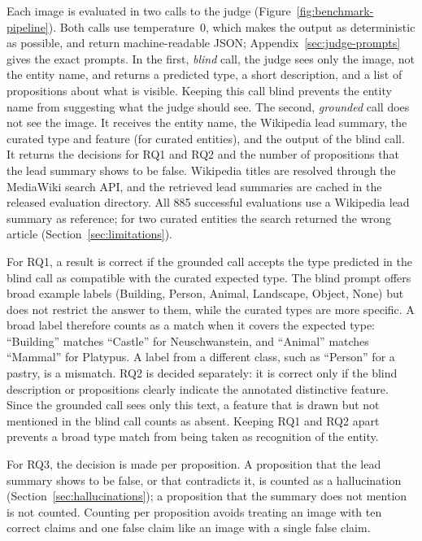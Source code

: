 Each image is evaluated in two calls to the judge
(Figure~\ref{fig:benchmark-pipeline}). Both calls use temperature~0, which
makes the output as deterministic as possible, and return machine-readable
JSON; Appendix~\ref{sec:judge-prompts} gives the exact prompts. In the first,
\emph{blind} call, the judge sees only the image, not the entity name, and
returns a predicted type, a short description, and a list of propositions about
what is visible. Keeping this call blind prevents the entity name from
suggesting what the judge should see. The second, \emph{grounded} call does not
see the image. It receives the entity name, the Wikipedia lead summary, the
curated type and feature (for curated entities), and the output of the blind
call. It returns the decisions for RQ1 and RQ2 and the number of propositions
that the lead summary shows to be false. Wikipedia titles are resolved through
the MediaWiki search API, and the retrieved lead summaries are cached in the
released evaluation directory. All 885 successful evaluations use a Wikipedia
lead summary as reference; for two curated entities the search returned the
wrong article (Section~\ref{sec:limitations}).




For RQ1, a result is correct if the grounded call accepts the type predicted in
the blind call as compatible with the curated expected type. The blind prompt offers
broad example labels (Building, Person, Animal, Landscape, Object, None) but
does not restrict the answer to them, while the curated types are more
specific. A broad label therefore counts as a match when it covers the expected
type: ``Building'' matches ``Castle'' for Neuschwanstein, and ``Animal''
matches ``Mammal'' for Platypus. A label from a different class, such as
``Person'' for a pastry, is a mismatch. RQ2 is decided separately: it is
correct only if the blind description or propositions clearly indicate the
annotated distinctive feature. Since the grounded call sees only this text, a
feature that is drawn but not mentioned in the blind call counts as absent. Keeping RQ1 and RQ2 apart prevents a broad type match from being taken
as recognition of the entity.

For RQ3, the decision is made per proposition. A proposition that the lead
summary shows to be false, or that contradicts it, is counted as a
hallucination (Section~\ref{sec:hallucinations}); a proposition that the
summary does not mention is not counted. Counting per proposition avoids
treating an image with ten correct claims and one false claim like an image
with a single false claim.

